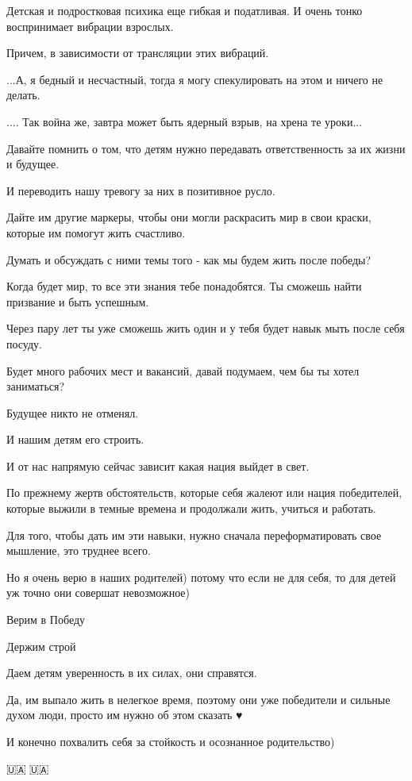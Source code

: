 Детская и подростковая психика еще гибкая и податливая. И очень тонко
воспринимает вибрации взрослых.

Причем, в зависимости от трансляции этих вибраций.

...А, я бедный и несчастный, тогда я могу спекулировать на этом и ничего не
делать.

.... Так война же, завтра может быть ядерный взрыв, на хрена те уроки...

Давайте помнить о том, что детям нужно передавать ответственность за их жизни и
будущее.

И переводить нашу тревогу за них в позитивное русло.

Дайте им другие маркеры, чтобы они могли раскрасить мир в свои краски, которые
им помогут жить счастливо.

Думать и обсуждать с ними темы того - как мы будем жить после победы?

Когда будет мир, то все эти знания тебе понадобятся. Ты сможешь найти призвание
и быть успешным.

Через пару лет ты уже сможешь жить один и у тебя будет навык мыть после себя
посуду.

Будет много рабочих мест и вакансий, давай подумаем, чем бы ты хотел
заниматься?

Будущее никто не отменял. 

И нашим детям его строить.

И от нас напрямую сейчас зависит какая нация выйдет в свет.

По прежнему жертв обстоятельств, которые себя жалеют или нация победителей,
которые выжили в темные времена и продолжали жить, учиться и работать.

Для того, чтобы дать им эти навыки, нужно сначала переформатировать свое
мышление, это труднее всего.

Но я очень верю в наших родителей) потому что если не для себя, то для детей уж
точно они совершат невозможное)

Верим в Победу

Держим строй

Даем детям уверенность в их силах, они справятся.

Да, им выпало жить в нелегкое время, поэтому они уже победители и сильные духом
люди, просто им нужно об этом сказать ♥️

И конечно похвалить себя за стойкость и осознанное родительство)

🇺🇦💙🇺🇦💛
